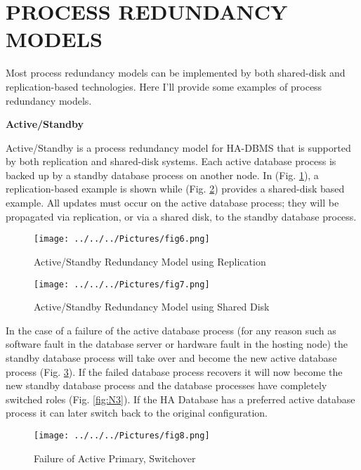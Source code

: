 \documentclass[english]{tktltiki2}
\theoremstyle{definition}
\theoremstyle{remark}
\begin{document}
\section{PROCESS REDUNDANCY MODELS}
Most process redundancy models can be implemented by both shared-disk and replication-based technologies. Here I'll provide some examples of process redundancy models.
\begin{flushleft}
\textbf{Active/Standby}
\end{flushleft}
Active/Standby is a process redundancy model for HA-DBMS that is supported by both replication and shared-disk systems. Each active
database process is backed up by a standby database process on another node.
In (Fig. \ref{N}), a replication-based example is shown while (Fig. \ref{fig:N1}) provides a shared-disk
based example. All updates must occur on the active database process; they will be
propagated via replication, or via a shared disk, to the standby database process.

\begin{figure}[h!]
\texttt{[image: ../../../Pictures/fig6.png]} 
\caption{Active/Standby Redundancy Model using Replication \cite{inproceedings}}
\label{N} 
\end{figure}

\begin{figure}[h!]
\texttt{[image: ../../../Pictures/fig7.png]}  
\caption{Active/Standby Redundancy Model using Shared Disk \cite{inproceedings}}
\label{fig:N1}
\end{figure}


\pagebreak

In the case of a failure of the active database process (for any reason such as software fault in the database server or hardware fault in the hosting node) the standby database process will take over and become the new active database process (Fig. \ref{fig:N2}). If the failed database process recovers it will now become the new standby database process and the database processes have completely switched roles (Fig. \ref{fig:N3}). If the HA Database has a preferred active database process it can later switch back to the original configuration.\\

\begin{figure}[h!]
\texttt{[image: ../../../Pictures/fig8.png]} 
\caption{Failure of Active Primary, Switchover \cite{inproceedings}}
\label{fig:N2}
\end{figure}
\end{document}
